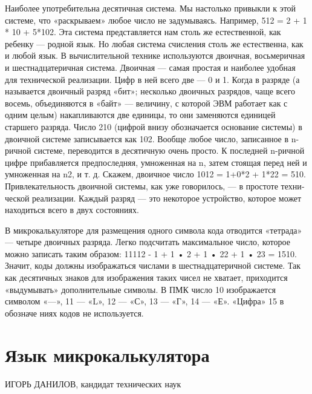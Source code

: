 \documentclass[11pt,a4paper,oneside]{article}
\begin{document}
Наиболее употребительна десятичная система. Мы на­столько привыкли к этой системе, что «раскрываем» любое число не задумываясь. Например, 512 = 2 + 1 * 10 + 5*102. Эта система представляется нам столь же естественной, как ребенку — родной язык. Но любая система счисления столь же естественна, как и любой язык. В вычислительной техни­ке используются двоичная, восьмеричная и шестнадцатеричная система. Двоичная — самая простая и наиболее удобная для технической реализации. Цифр в ней всего две — 0 и 1. Ко­гда в разряде (а называется двоичный разряд «бит»; несколь­ко двоичных разрядов, чаще всего восемь, объединяются в «байт» — величину, с которой ЭВМ работает как с одним целым) накапливаются две единицы, то они заменяются еди­ницей старшего разряда. Число 210 (цифрой внизу обознача­ется основание системы) в двоичной системе записывается как 102. Вообще любое число, записанное в n-ричной системе, пе­реводится в десятичную очень просто. К последней n-ричной цифре прибавляется предпоследняя, умноженная на n, затем стоящая перед ней и умноженная на n2, и т. д. Скажем, дво­ичное число 1012 = 1+0*2 + 1*22 = 510. Привлекательность двоичной системы, как уже говорилось, — в простоте техни­ческой реализации. Каждый разряд — это некоторое устрой­ство, которое может находиться всего в двух состояниях.

В микрокалькуляторе для размещения одного символа кода отводится «тетрада» — четыре двоичных разряда. Легко под­считать максимальное число, которое можно записать таким образом: 11112 - 1 + 1 • 2 + 1 • 22 + 1 • 23 = 1510. Значит, ко­ды должны изображаться числами в шестнадцатеричной си­стеме. Так как десятичных знаков для изображения таких чисел не хватает, приходится «выдумывать» дополнительные символы. В ПМК число 10 изображается символом «—», 11 — «L», 12 — «С», 13 — «Г», 14 — «Е». «Цифра» 15 в обозначе ниях кодов не используется.

\section{Язык микрокаль­кулятора}
ИГОРЬ ДАНИЛОВ,
кандидат технических наук
\end{document}
